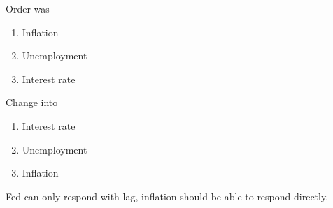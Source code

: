 \documentclass{beamer}
\begin{document}
\begin{frame}
  Order was
  \begin{enumerate}
    \item Inflation
    \item Unemployment
    \item Interest rate
  \end{enumerate}
  \medskip
  Change into  
  \begin{enumerate}
    \item Interest rate 
    \item Unemployment
    \item Inflation
  \end{enumerate}
  \medskip
  Fed can only respond with lag, inflation should be able to respond directly.
\end{frame}
\end{document}
